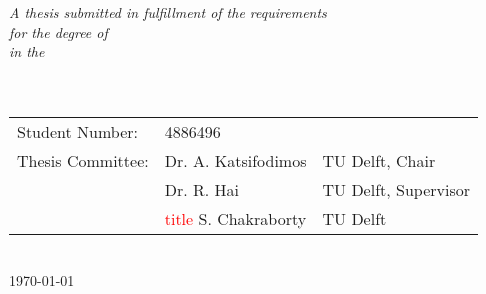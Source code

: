\documentclass[
11pt, %
english, %
singlespacing, %
parskip, %
headsepline, %
dvipsnames]{misc/MastersDoctoralThesis} %
\theoremstyle{definition}
\newcommand\todo[1]{\textcolor{red}{#1}}
\begin{document}
\begin{titlepage}
\begin{center}
        \large \textit{A thesis submitted in fulfillment of the requirements\\ for the degree of \degreename}\\[0.3cm] %
        \textit{in the}\\[0.4cm]
        \groupname\\\deptname\\[2cm] %

        \vfill

        \begin{tabular}{lll}
            Student Number:   & 4886496                                            \\
            Thesis Committee: & Dr. A. Katsifodimos         & TU Delft, Chair      \\
                              & Dr. R. Hai                  & TU Delft, Supervisor \\
                              & \todo{title} S. Chakraborty & TU Delft
        \end{tabular} \\[0.3cm]
        {\large \today}\\[4cm] %

        \vfill
    \end{center}
\end{titlepage}

\end{document}
